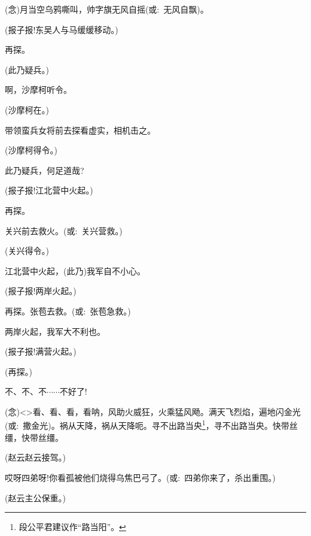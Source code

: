 {\vspace{5pt}

({\akai 念})月当空乌鸦嘶叫，帅字旗无风自摇({\akai 或}:~无风自飘)。

(报子\hspace{30pt}报!东吴人与马缓缓移动。)

再探。

(此乃疑兵。)

啊，沙摩柯听令。

(沙摩柯\hspace{20pt}在。)

带领蛮兵女将前去探看虚实，相机击之。

(沙摩柯\hspace{20pt}得令。)

此乃疑兵，何足道哉?

(报子\hspace{30pt}报!江北营中火起。)

再探。

关兴前去救火。({\akai 或}:~关兴营救。)

(关兴\hspace{30pt}得令。)

江北营中火起，(此乃)我军自不小心。

(报子\hspace{30pt}报!两岸火起。)

再探。张苞去救。({\akai 或}:~张苞急救。)

两岸火起，我军大不利也。

(报子\hspace{30pt}报!满营火起。)

(再探。)

不、不、不$\cdots{}\cdots{}$不好了!

({\akai 念})\textless{}\!\textgreater{}看、看、看，看呐，风助火威狂，火乘猛风飏。满天飞烈焰，遍地闪金光({\akai 或}:~撒金光)。祸从天降，祸从天降呃。寻不出路当央\footnote{段公平{\scriptsize 君}建议作``路当阳''。}，寻不出路当央。快带丝缰，快带丝缰。

\vspace{5pt}

(赵云\hspace{30pt}赵云接驾。)

哎呀四弟呀!你看孤被他们烧得乌焦巴弓了。({\akai 或}:~四弟你来了，杀出重围。)

(赵云\hspace{30pt}主公保重。)

}
